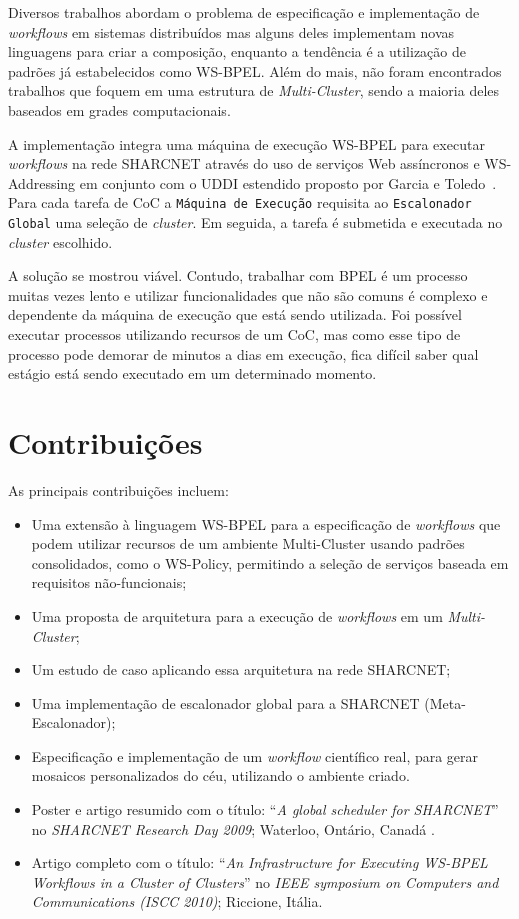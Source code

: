 \documentclass[12pt]{report} %
\begin{document}
    Diversos trabalhos abordam o problema de especificação e implementação de \textit{workflows} em sistemas distribuídos mas alguns deles implementam novas linguagens para criar a composição, enquanto a tendência é a utilização de padrões já estabelecidos como WS-BPEL.
    Além do mais, não foram encontrados trabalhos que foquem em uma estrutura de \textit{Multi-Cluster}, sendo a maioria deles baseados em grades computacionais.	

    A implementação integra uma máquina de execução WS-BPEL para executar \textit{workflows} na rede SHARCNET através do uso de serviços Web assíncronos e WS-Addressing em conjunto com o UDDI estendido proposto por Garcia e Toledo~\cite{DiegoUDDI}.
    Para cada tarefa de CoC a \texttt{Máquina de Execução} requisita ao \texttt{Escalonador Global} uma seleção de \textit{cluster}.
    Em seguida, a tarefa é submetida e executada no \textit{cluster} escolhido.
    
    A solução se mostrou viável.
    Contudo, trabalhar com BPEL é um processo muitas vezes lento e utilizar funcionalidades que não são comuns é complexo e dependente da máquina de execução que está sendo utilizada.
    Foi possível executar processos utilizando recursos de um CoC, mas como esse tipo de processo pode demorar de minutos a dias em execução, fica difícil saber qual estágio está sendo executado em um determinado momento.

    \section{Contribuições}
	As principais contribuições incluem:
	\begin{itemize}
	 \item Uma extensão à linguagem WS-BPEL para a especificação de \textit{workflows} que podem utilizar recursos de um ambiente Multi-Cluster usando padrões consolidados, como o WS-Policy, permitindo a seleção de serviços baseada em requisitos não-funcionais;
	 \item Uma proposta de arquitetura para a execução de \textit{workflows} em um \textit{Multi-Cluster};
	 \item Um estudo de caso aplicando essa arquitetura na rede SHARCNET;
	 \item Uma implementação de escalonador global para a SHARCNET (Meta-Escalonador);
	 \item Especificação e implementação de um \textit{workflow} científico real, para gerar mosaicos personalizados do céu, utilizando o ambiente criado.	 
	 \item Poster e artigo resumido com o título: ``\textit{A global scheduler for SHARCNET}'' no \textit{SHARCNET Research Day 2009}; Waterloo, Ontário, Canadá \cite{Lechuga2}.
	 \item Artigo completo com o título: ``\textit{An Infrastructure for Executing WS-BPEL Workflows in a Cluster of Clusters}'' no \textit{IEEE symposium on Computers and Communications (ISCC 2010)}; Riccione, Itália\cite{Lechuga1}.
	\end{itemize}
\end{document}
